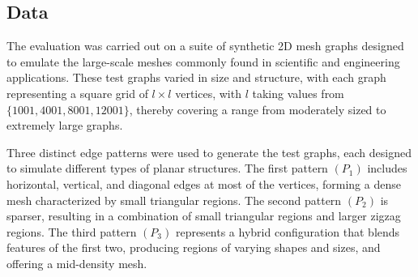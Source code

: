 \documentclass[conference]{IEEEtran}
\begin{document}



\subsection{Data}
The evaluation was carried out on a suite of synthetic 2D mesh graphs designed to emulate the large-scale meshes commonly found in scientific and engineering applications. These test graphs varied in size and structure, with each graph representing a square grid of \(l \times l\) vertices, with \(l\) taking values from \(\{1001, 4001, 8001, 12001\}\), thereby covering a range from moderately sized to extremely large graphs.

Three distinct edge patterns were used to generate the test graphs, each designed to simulate different types of planar structures. The first pattern \((P_1)\) includes horizontal, vertical, and diagonal edges at most of the vertices, forming a dense mesh characterized by small triangular regions. The second pattern \((P_2)\) is sparser, resulting in a combination of small triangular regions and larger zigzag regions. The third pattern \((P_3)\) represents a hybrid configuration that blends features of the first two, producing regions of varying shapes and sizes, and offering a mid-density mesh.
\end{document}
